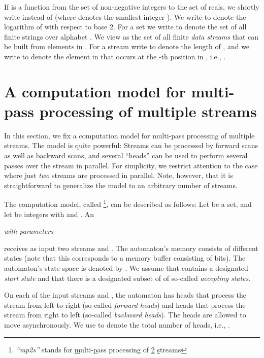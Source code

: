 \documentclass[proceedings]{stacs}
\theoremstyle{plain}\newtheorem{satz}[thm]{Satz}
\theoremstyle{definition}\newtheorem{crucial}[thm]{Crucial Definition}
\newcommand{\aut}{\text{mp2s-automaton}}
\newcommand{\auta}{\text{mp2s-automata}}
\begin{document}
If  is a function from the set of non-negative integers to the set
of reals, we shortly write  instead of  (where
 denotes the smallest integer ).
We write  to denote the logarithm of  with respect to base 2.
For a set  we write  to denote the set of all 
finite strings over alphabet . We view   as 
the set of all finite \emph{data streams} that can be built from 
elements in .
For a stream  write  to denote the
length of , and we write  to denote the element 
in  that occurs at the -th position in , i.e., 
.


\section{A computation model for multi-pass processing of multiple streams}
\label{section:mpms-automata}

In this section, we fix a computation model for multi-pass processing
of multiple streams. 
The model is quite powerful: 
Streams can be processed by forward scans as well as backward scans, and
several ``heads'' can be used to perform several passes over the stream 
in parallel.
For simplicity, we restrict attention to the case
where just \emph{two} streams are processed in parallel.
Note, however, that it is straightforward to generalize the model to an
arbitrary number of streams.

The computation model, called
\emph{\auta}\footnote{\emph{``mp2s''} stands for 
\underline{m}ulti-\underline{p}ass processing of \underline{2} 
\underline{s}treams}, can be described as follows:
Let  be a set, and let  be integers with 
 and .
An \vspace{1ex} 
\begin{center}
  \emph{\aut{}  with parameters }  \vspace{1ex}
\end{center}
receives as input two streams  and .
The automaton's memory consists of  different states
(note that this corresponds to a memory buffer consisting of 
 bits). The automaton's state space is denoted by .
We assume that  contains a designated \emph{start state} and
that there is a designated subset  of  of 
so-called \emph{accepting states}.

On each of the input streams  and , the automaton
has  heads that process the stream from left to right 
(so-called \emph{forward heads}) and  heads that process the stream 
from right to left (so-called \emph{backward heads}).
The heads are allowed to move asynchronously.
We use  to denote the total number of heads, i.e., .
\end{document}
